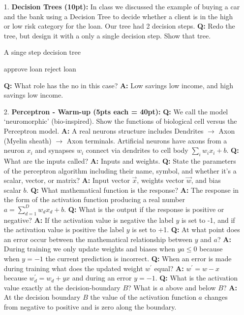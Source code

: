\documentclass[main.tex]{subfiles}
\begin{document}
\begin{enumerate}

\item[1.] \textbf{Decision Trees (10pt):} In class we discussed the example of buying a car and the bank using a Decision Tree to decide whether a client is in the high or low risk category for the loan. Our tree had 2 decision steps. \textbf{Q:} Redo the tree, but design it with a only a single decision step. Show that tree. 

\begin{algorithm}
\caption{A singe step decision tree}
\begin{algorithmic}[1]
    \State approve loan
\Else
    \State reject loan
\end{algorithmic}
\end{algorithm}

\textbf{Q:} What role has the no in this case? \textbf{A:} Low savings low income, and high savings low income.

\item[2.] \textbf{Perceptron - Warm-up (5pts each = 40pt):} \textbf{Q:} We call the model ‘neuromorphic’ (bio-inspired). Show the functions of biological cell versus the Perceptron model. \textbf{A:} A real neurons structure includes Dendrites $\rightarrow$ Axon (Myelin sheath) $\rightarrow$ Axon terminals. Artificial neurons have axons from a neuron $x_i$ and synapses $w_i$ connect via dendrites to cell body $\sum_{i} w_i x_i +b$. \textbf{Q:} What are the inputs called? \textbf{A:} Inputs and weights. \textbf{Q:} State the parameters of the perceptron algorithm including their name, symbol, and whether it’s a scalar, vector, or matrix? \textbf{A:} Input vector $\vec{x}$, weights vector $\vec{w}$, and bias scalar $b$. \textbf{Q:} What mathematical function is the response? \textbf{A:} The response in the form of the activation function producing a real number $a=\sum_{d=1}^{D} w_d x_d + b$. \textbf{Q:} What is the output if the response is positive or negative? \textbf{A:} If the activation value is negative the label $y$ is set to -1, and if the activation value is positive the label $y$ is set to +1. \textbf{Q:} At what point does an error occur between the mathematical relationship between $y$ and $a$? \textbf{A:} During training we only update weights and biases when $ya \leq 0$ because when $y = -1$  the current prediction is incorrect. \textbf{Q:} When an error is made during training what does the updated weight $w^{\prime}$ equal? \textbf{A:} $w^{\prime} = w - x$ because $w_d^{\prime} = w_d + yx$ and during an error $y=-1$. \textbf{Q:} What is the activation value exactly at the decision-boundary $B$? What is $a$ above and below $B$? \textbf{A:} At the decision boundary $B$ the value of the activation function $a$ changes from negative to positive and is zero along the boundary.    


\end{enumerate}
\end{document}
